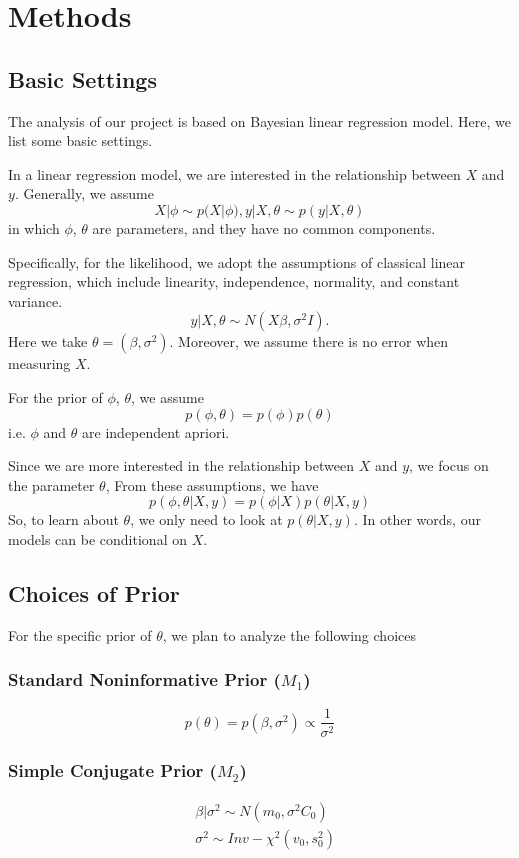 \documentclass[12pt,a4paper]{article}
\begin{document}
\section{Methods}
\subsection{Basic Settings}
The analysis of our project is based on Bayesian linear regression model. Here, we list some basic settings.

In a linear regression model, we are interested in the relationship between $X$ and $y$. Generally, we assume
 $$X|\phi \sim p(X|\phi), y|X,\theta \sim p(y|X, \theta)$$
in which $\phi$, $\theta$ are parameters, and they have no common components. 

Specifically, for the likelihood, we adopt the assumptions of classical linear regression, which include linearity, independence, normality, and constant variance.
$$
y|X, \theta  \sim N(X \beta, \sigma^2 I).
$$
Here we take $\theta = (\beta, \sigma^2)$. Moreover, we assume there is no error when measuring $X$.

For the prior of $\phi$, $\theta$, we assume 
$$
p(\phi, \theta) = p(\phi) p(\theta)
$$
i.e. $\phi$ and  $\theta$ are independent apriori.

Since we are more interested in the relationship between $X$ and $y$, we focus on the parameter $\theta$, From these assumptions, we have
$$
p(\phi, \theta|X,y) = p(\phi|X)p(\theta|X,y)
$$
So, to learn about $\theta$, we only need to look at $p(\theta|X,y)$.  In other words, our models can be conditional on $X$.

\subsection{Choices of Prior}
For the specific prior of $\theta$, we plan to analyze the following choices
\subsubsection{Standard Noninformative Prior ($M_1$)}
$$
p(\theta) = p(\beta, \sigma^2) \propto \frac{1}{\sigma^2}
$$
\subsubsection{Simple Conjugate Prior ($M_2$)}
\begin{align*}
&\beta|\sigma^2 \sim N(m_0, \sigma^2 C_0)\\
&\sigma^2 \sim Inv-\chi^2(v_0, s_0^2)
\end{align*}
\end{document}
